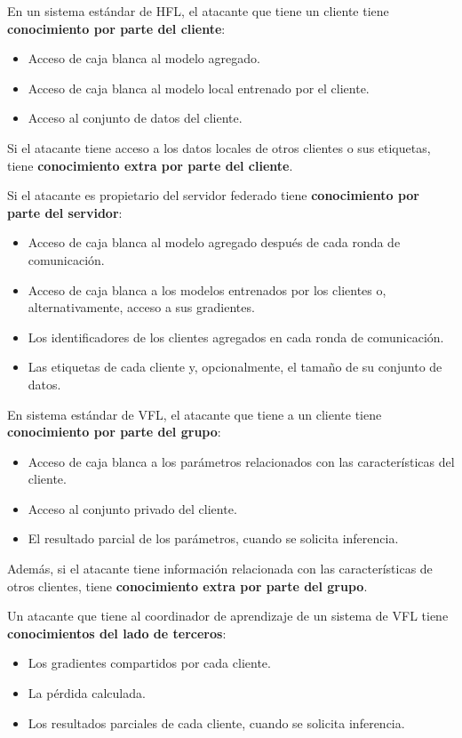 \begin{itemize}
        En un sistema estándar de \ac{HFL}, el atacante que tiene un cliente tiene \textbf{conocimiento por parte del cliente}:
        \begin{itemize}
            \item Acceso de caja blanca al modelo agregado.
            \item Acceso de caja blanca al modelo local entrenado por el cliente.
            \item Acceso al conjunto de datos del cliente.
        \end{itemize}

        Si el atacante tiene acceso a los datos locales de otros clientes o sus etiquetas, tiene \textbf{conocimiento extra por parte del cliente}.

        Si el atacante es propietario del servidor federado tiene \textbf{conocimiento por parte del servidor}:
        \begin{itemize}
            \item Acceso de caja blanca al modelo agregado después de cada ronda de comunicación.
            \item Acceso de caja blanca a los modelos entrenados por los clientes o, alternativamente, acceso a sus gradientes.
            \item Los identificadores de los clientes agregados en cada ronda de comunicación.
            \item Las etiquetas de cada cliente y, opcionalmente, el tamaño de su conjunto de datos.
        \end{itemize}

        En sistema estándar de \ac{VFL}, el atacante que tiene a un cliente tiene \textbf{conocimiento por parte del grupo}:
        \begin{itemize}
            \item Acceso de caja blanca a los parámetros relacionados con las características del cliente.
            \item Acceso al conjunto privado del cliente.
            \item El resultado parcial de los parámetros, cuando se solicita inferencia.
        \end{itemize}

        Además, si el atacante tiene información relacionada con las características de otros clientes, tiene \textbf{conocimiento extra por parte del grupo}.

        Un atacante que tiene al coordinador de aprendizaje de un sistema de \ac{VFL} tiene \textbf{conocimientos del lado de terceros}:
        \begin{itemize}
            \item Los gradientes compartidos por cada cliente.
            \item La pérdida calculada.
            \item Los resultados parciales de cada cliente, cuando se solicita inferencia.
        \end{itemize}


\end{itemize}
